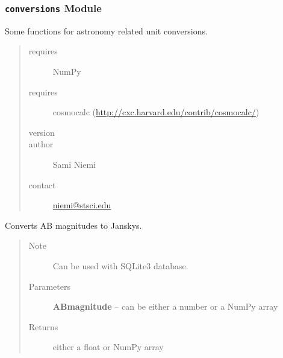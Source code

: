 \documentclass[letterpaper,10pt,english]{sphinxmanual}
\begin{document}
\subsubsection{\texttt{conversions} Module}
\label{SamPy.astronomy:module-SamPy.astronomy.conversions}\label{SamPy.astronomy:conversions-module}
Some functions for astronomy related unit conversions.
\begin{quote}\begin{description}
\item[{requires}] \leavevmode
NumPy

\item[{requires}] \leavevmode
cosmocalc (\href{http://cxc.harvard.edu/contrib/cosmocalc/}{http://cxc.harvard.edu/contrib/cosmocalc/})

\item[{version}] 

\item[{author}] \leavevmode
Sami Niemi

\item[{contact}] \leavevmode
\href{mailto:niemi@stsci.edu}{niemi@stsci.edu}

\end{description}\end{quote}


\begin{fulllineitems}
\label{SamPy.astronomy:SamPy.astronomy.conversions.ABMagnitudeToJansky}
Converts AB magnitudes to Janskys.
\begin{quote}\begin{description}
\item[{Note }] \leavevmode
Can be used with SQLite3 database.

\item[{Parameters}] \leavevmode
\textbf{ABmagnitude} -- can be either a number or a NumPy array

\item[{Returns}] \leavevmode
either a float or NumPy array

\end{description}\end{quote}

\end{fulllineitems}
\end{document}

